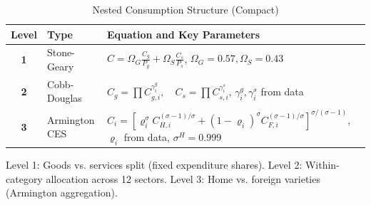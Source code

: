 \begin{table}[htbp]
\centering
\caption{Nested Consumption Structure (Compact)}
\label{tab:consumption_structure_compact}
\begin{tabular}{cll}
\toprule
\textbf{Level} & \textbf{Type} & \textbf{Equation and Key Parameters} \\
\midrule
\textbf{1} & Stone-Geary & $C = \Omega_G \frac{C_g}{P_g} + \Omega_S \frac{C_s}{P_s}$, \quad $\Omega_G = 0.57, \Omega_S = 0.43$ \\[0.3cm]
\textbf{2} & Cobb-Douglas & $C_g = \prod C_{g,i}^{\gamma^g_i}, \quad C_s = \prod C_{s,i}^{\gamma^s_i}$, \quad $\gamma^g_i, \gamma^s_i$ from data \\[0.3cm]
\textbf{3} & Armington CES & $C_i = \left[\varrho_i^\sigma C_{H,i}^{(\sigma-1)/\sigma} + (1-\varrho_i)^\sigma C_{F,i}^{(\sigma-1)/\sigma}\right]^{\sigma/(\sigma-1)}$, \quad $\varrho_i$ from data, $\sigma^H = 0.999$ \\
\bottomrule
\end{tabular}
\begin{tablenotes}[flushleft]
\small
\item[] Level 1: Goods vs. services split (fixed expenditure shares). Level 2: Within-category allocation across 12 sectors. Level 3: Home vs. foreign varieties (Armington aggregation).
\end{tablenotes}
\end{table}
